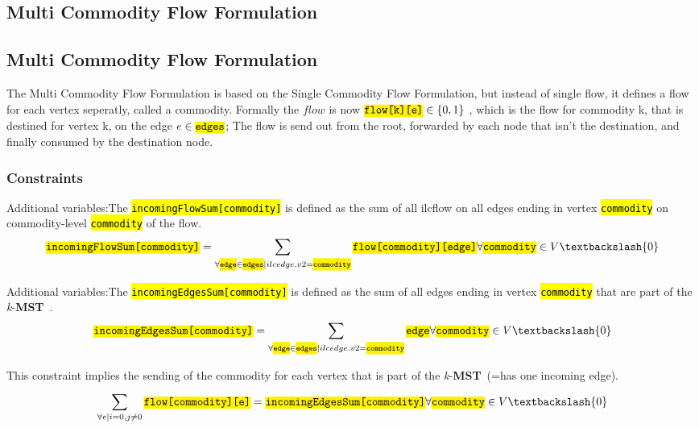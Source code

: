 \documentclass[,%
			paper=a4,%
			DIV12,
			liststotoc,
			bibtotoc,
			draft=false,%
			numbers=noendperiod
			]{scrartcl}
\newcommand{\mst}{\textbf{MST}}
\newcommand{\kmst}{\textit{k}-\mst}
\newcommand{\ilc}[1]{\hl{\texttt{#1}}} %
\begin{document}
\subsection{Multi Commodity Flow Formulation}
\subsection{Multi Commodity Flow Formulation}
The Multi Commodity Flow Formulation is based on the Single Commodity Flow Formulation, but instead of single flow, it defines a flow for each vertex seperatly, called a commodity. Formally the $flow$ is now $\ilc{flow[k][e]} \in \left\{0,1\right\}$ , which is the flow for commodity k, that is destined for vertex k, on the edge $e \in \ilc{edges}$; The flow is send out from the root, forwarded by each node that isn't the destination, and finally consumed by the destination node.

\subsubsection{Constraints}
Additional variables:The \ilc{incomingFlowSum[commodity]} is defined as the sum of all ilc{flow} on all edges ending in vertex \ilc{commodity} on commodity-level \ilc{commodity} of the flow.
\begin{equation}\label{eq:mfcInFlow}
	 \ilc{incomingFlowSum[commodity]} = \sum_{\forall \ilc{edge} \in \ilc{edges}| ilc{edge.v2} = \ilc{commodity}} \ilc{flow[commodity][edge]} 
\forall \ilc{commodity} \in V \textbackslash \{0\}
\end{equation}

Additional variables:The \ilc{incomingEdgesSum[commodity]} is defined as the sum of all edges ending in vertex \ilc{commodity} that are part of the \kmst\ .
\begin{equation}\label{eq:mfcInEdges}
	 \ilc{incomingEdgesSum[commodity]} = \sum_{\forall \ilc{edge} \in \ilc{edges} | ilc{edge.v2} = \ilc{commodity}} \ilc{edge} 
\forall \ilc{commodity} \in V \textbackslash \{0\}
\end{equation}


This constraint implies the sending of the commodity for each vertex that is part of the \kmst\ (=has one incoming edge).
\begin{equation}\label{eq:mfcSend}
	\sum_{\forall e|i=0, j \neq 0}^{} \ilc{flow[commodity][e]} = \ilc{incomingEdgesSum[commodity]}
\forall \ilc{commodity} \in V  \textbackslash \{0\}
\end{equation}
\end{document}
